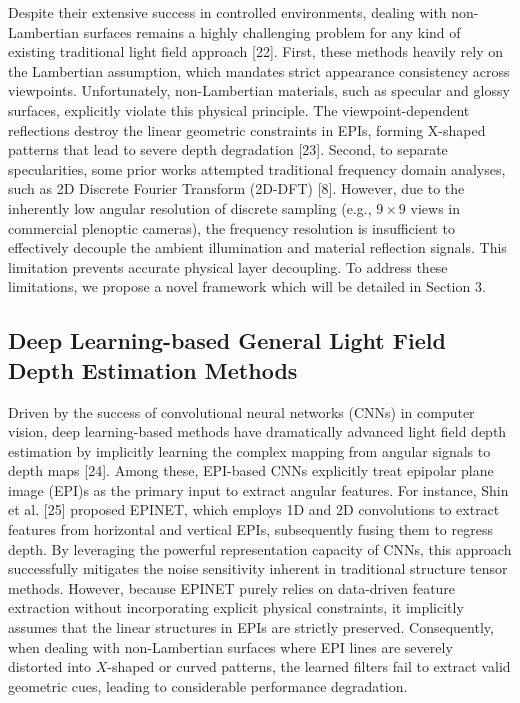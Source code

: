 Despite their extensive success in controlled environments, dealing with non-Lambertian surfaces remains a highly challenging problem for any kind of existing traditional light field approach [22]. First, these methods heavily rely on the Lambertian assumption, which mandates strict appearance consistency across viewpoints. Unfortunately, non-Lambertian materials, such as specular and glossy surfaces, explicitly violate this physical principle. The viewpoint-dependent reflections destroy the linear geometric constraints in EPIs, forming X-shaped patterns that lead to severe depth degradation [23]. Second, to separate specularities, some prior works attempted traditional frequency domain analyses, such as 2D Discrete Fourier Transform (2D-DFT) [8]. However, due to the inherently low angular resolution of discrete sampling (e.g., $9 \times 9$ views in commercial plenoptic cameras), the frequency resolution is insufficient to effectively decouple the ambient illumination and material reflection signals. This limitation prevents accurate physical layer decoupling. To address these limitations, we propose a novel framework which will be detailed in Section 3.

\subsection{Deep Learning-based General Light Field Depth Estimation Methods}

Driven by the success of convolutional neural networks (CNNs) in computer vision, deep learning-based methods have dramatically advanced light field depth estimation by implicitly learning the complex mapping from angular signals to depth maps [24]. Among these, EPI-based CNNs explicitly treat epipolar plane image (EPI)s as the primary input to extract angular features. For instance, Shin et al. [25] proposed EPINET, which employs 1D and 2D convolutions to extract features from horizontal and vertical EPIs, subsequently fusing them to regress depth. By leveraging the powerful representation capacity of CNNs, this approach successfully mitigates the noise sensitivity inherent in traditional structure tensor methods. However, because EPINET purely relies on data-driven feature extraction without incorporating explicit physical constraints, it implicitly assumes that the linear structures in EPIs are strictly preserved. Consequently, when dealing with non-Lambertian surfaces where EPI lines are severely distorted into $X$-shaped or curved patterns, the learned filters fail to extract valid geometric cues, leading to considerable performance degradation.

